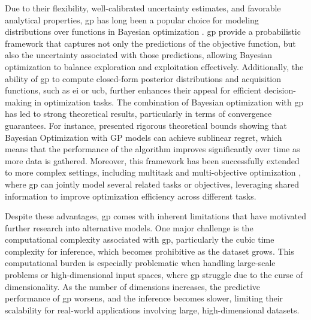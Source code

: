 Due to their flexibility, well-calibrated uncertainty estimates, and favorable analytical properties, \ac{gp} has long been a popular choice for modeling distributions over functions in Bayesian optimization \citep{osborne2009gaussian}. \ac{gp} provide a probabilistic framework that captures not only the predictions of the objective function, but also the uncertainty associated with those predictions, allowing Bayesian optimization to balance exploration and exploitation effectively. Additionally, the ability of \ac{gp} to compute closed-form posterior distributions and acquisition functions, such as \ac{ei} or \ac{ucb}, further enhances their appeal for efficient decision-making in optimization tasks. The combination of Bayesian optimization with \ac{gp} has led to strong theoretical results, particularly in terms of convergence guarantees. For instance, \citet{srinivas2009gaussian} presented rigorous theoretical bounds showing that Bayesian Optimization with GP models can achieve sublinear regret, which means that the performance of the algorithm improves significantly over time as more data is gathered. Moreover, this framework has been successfully extended to more complex settings, including multitask and multi-objective optimization \citep{swersky2013multi}, where \ac{gp} can jointly model several related tasks or objectives, leveraging shared information to improve optimization efficiency across different tasks.

Despite these advantages, \ac{gp} comes with inherent limitations that have motivated further research into alternative models. One major challenge is the computational complexity associated with \ac{gp}, particularly the cubic time complexity for inference, which becomes prohibitive as the dataset grows. This computational burden is especially problematic when handling large-scale problems or high-dimensional input spaces, where \ac{gp} struggle due to the curse of dimensionality. As the number of dimensions increases, the predictive performance of \ac{gp} worsens, and the inference becomes slower, limiting their scalability for real-world applications involving large, high-dimensional datasets.

